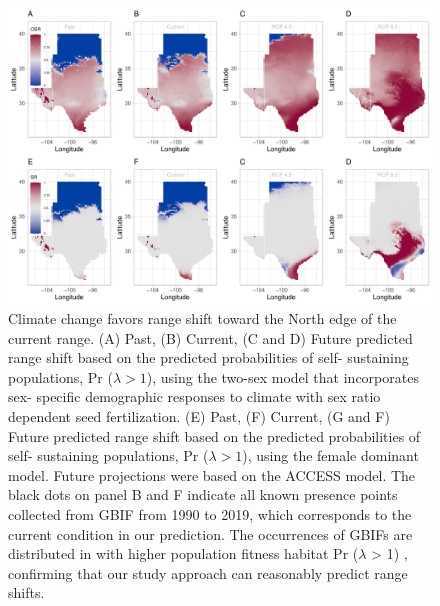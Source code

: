 \documentclass[12pt]{article}
\begin{document}
\begin{figure}[H]
  \begin{center}
    \includegraphics[width=0.99\linewidth]{Figures/Fig_geo_sr_acc.pdf}
  \caption{Climate change favors range shift toward the North edge of the current range.
  (A) Past, (B) Current, (C and D) Future predicted range shift based on the predicted probabilities of self- sustaining populations, Pr ($\lambda > 1$), using the two-sex model that incorporates sex- specific demographic responses to climate with sex ratio dependent seed fertilization.
  (E) Past, (F) Current, (G and F) Future  predicted range shift based on the predicted probabilities of self- sustaining populations, Pr ($\lambda > 1$), using the female dominant model.
  Future projections were based on the  ACCESS model.
  The black dots on panel B and F indicate all known presence points collected from GBIF from 1990 to 2019, which corresponds to the current condition in our prediction. 
  The occurrences of GBIFs are distributed in with higher population fitness habitat Pr ($\lambda$ > 1) , confirming that our study approach can reasonably predict range shifts.}
  \label{Sup:srprojcmc}
  \end{center}
\end{figure}
\end{document}

